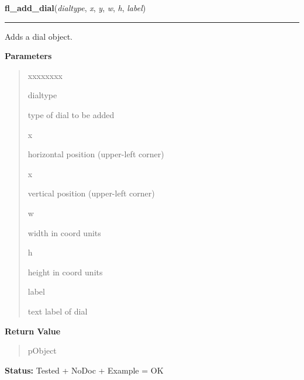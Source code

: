     \label{xformslib:library:fl_add_dial}

    \vspace{0.5ex}

\hspace{.8\funcindent}\begin{boxedminipage}{\funcwidth}

    \raggedright \textbf{fl\_add\_dial}(\textit{dialtype}, \textit{x}, \textit{y}, \textit{w}, \textit{h}, \textit{label})

    \vspace{-1.5ex}

    \rule{\textwidth}{0.5\fboxrule}
\setlength{\parskip}{2ex}
    Adds a dial object.

\setlength{\parskip}{1ex}
      \textbf{Parameters}
      \vspace{-1ex}

      \begin{quote}
        \begin{Ventry}{xxxxxxxx}

          \item[dialtype]

          type of dial to be added

          \item[x]

          horizontal position (upper-left corner)

          \item[x]

          vertical position (upper-left corner)

          \item[w]

          width in coord units

          \item[h]

          height in coord units

          \item[label]

          text label of dial

        \end{Ventry}

      \end{quote}

      \textbf{Return Value}
    \vspace{-1ex}

      \begin{quote}
      pObject

      \end{quote}

\textbf{Status:} Tested + NoDoc + Example = OK



    \end{boxedminipage}

